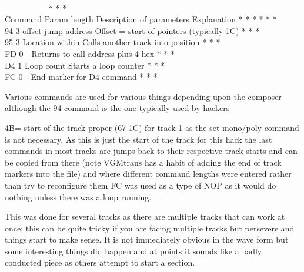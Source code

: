 \documentclass[
]{book}
\begin{document}
~~~~\textbar{} \textbar{} \textbar{} \textbar{}\\
--- \textbar{} --- \textbar{} --- \textbar{} --- \textbar{} * * * \textbar{}\\
Command \textbar{} Param length \textbar{} Description of parameters \textbar{} Explanation \textbar{} * * * \textbar{} * * * \textbar{}\\
94 \textbar{} 3 \textbar{} offset jump address \textbar{} Offset = start of pointers (typically 1C) \textbar{} * * * \textbar{}\\
95 \textbar{} 3 \textbar{} Location within \textbar{} Calls another track into position \textbar{} * * * \textbar{}\\
FD \textbar{} 0 \textbar{} - \textbar{} Returns to call address plus 4 hex \textbar{} * * * \textbar{}\\
D4 \textbar{} 1 \textbar{} Loop count \textbar{} Starts a loop counter \textbar{} * * * \textbar{}\\
FC \textbar{} 0 \textbar{} - \textbar{} End marker for D4 command \textbar{} * * * \textbar{}

Various commands are used for various things depending upon the composer although the 94 command is the one typically used by hackers

4B= start of the track proper (67-1C) for track 1 as the set mono/poly command is not necessary. As this is just the start of the track for this hack the last commands in most tracks are jumps back to their respective track starts and can be copied from there (note VGMtrans has a habit of adding the end of track markers into the file) and where different command lengths were entered rather than try to reconfigure them FC was used as a type of NOP as it would do nothing unless there was a loop running.

This was done for several tracks as there are multiple tracks that can work at once; this can be quite tricky if you are facing multiple tracks but persevere and things start to make sense. It is not immediately obvious in the wave form but some interesting things did happen and at points it sounds like a badly conducted piece as others attempt to start a section.
\end{document}
